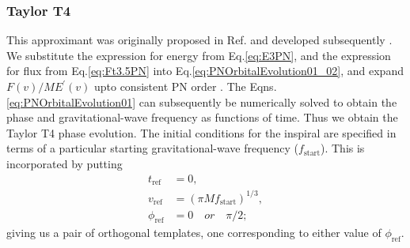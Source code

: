 \documentclass[aps,
prd,
amsmath,
amssymb,
twocolumn,
floatfix,
groupedaddress]{revtex4-1}
\newcommand{\refr}{\mathrm{ref}}
\newcommand{\start}{\mathrm{start}}
\begin{document}
\subsubsection{Taylor T4}\label{sec:level2:TaylorT4}
This approximant was originally proposed in Ref.\citep{TaylorT4Origin} and developed subsequently \citep{NRPNComparisonBaker2007,NRdynamicsq1,NRPNComparisonBoyleetal}.
We substitute the expression for energy from Eq.\eqref{eq:E3PN}, and the expression for flux from Eq.\eqref{eq:Ft3.5PN} into Eq.\eqref{eq:PNOrbitalEvolution01_02},
and expand $F(v)/ME^{\prime}(v)$ upto consistent PN order \citep{FluxandE3-5PN,PNFluxEnergy2PN,PNFluxEnergy3PN01,PNFluxEnergy3PN02,CompTemplates2001,GW2PN}.
The Eqns.\eqref{eq:PNOrbitalEvolution01} can subsequently be numerically solved to obtain the phase and gravitational-wave frequency as functions of time.
Thus we obtain the Taylor T4 phase evolution. The initial conditions for the inspiral are specified in terms of a particular starting gravitational-wave
frequency ($f_{\start}$). This is incorporated by putting
\begin{subequations}
\begin{align}
t_{\refr} &= 0,\\
v_{\refr} &= (\pi M f_{\start})^{1/3},\\
\phi_{\refr} &= 0\quad \textit{or}\quad \pi/2;
\end{align}
\end{subequations}
giving us a pair of orthogonal templates, one corresponding to either value of $\phi_{\refr}$.
\end{document}
